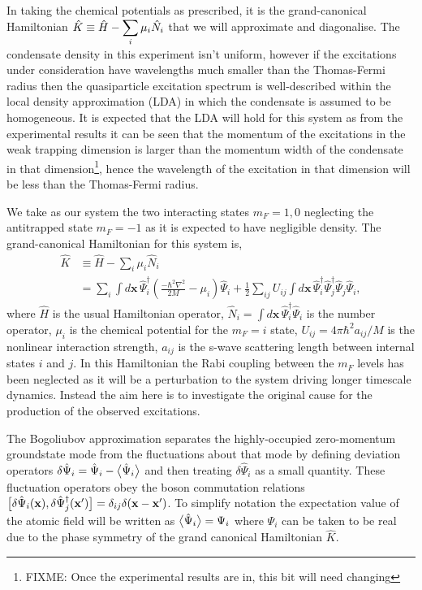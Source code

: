 In taking the chemical potentials as prescribed, it is the grand-canonical Hamiltonian $\displaystyle\protect{\hat{K} \equiv \hat{H} - \sum_i \mu_i \hat{N}_i}$ that we will approximate and diagonalise.  The condensate density in this experiment isn't uniform, however if the excitations under consideration have wavelengths much smaller than the Thomas-Fermi radius then the quasiparticle excitation spectrum is well-described within the local density approximation (LDA) \citep{Stamper-Kurn:1999,Zambelli:2000} in which the condensate is assumed to be homogeneous.  It is expected that the LDA will hold for this system as from the experimental results it can be seen that the momentum of the excitations in the weak trapping dimension is larger than the momentum width of the condensate in that dimension\footnote{FIXME: Once the experimental results are in, this bit will need changing}, hence the wavelength of the excitation in that dimension will be less than the Thomas-Fermi radius.


We take as our system the two interacting states $m_F=1, 0$ neglecting the antitrapped state $m_F=-1$ as it is expected to have negligible density. The grand-canonical Hamiltonian for this system is,
\begin{align}
    \hat{K} &\equiv \hat{H} - \sum_i \mu_i \hat{N}_i\\
            &= \sum_i \int d\mathbf{x}\, \hat{\Psi}_i^\dagger \left(\frac{-\hbar^2 \nabla^2}{2 M} - \mu_i\right)\hat{\Psi}_i + \frac{1}{2} \sum_{i j} U_{i j}\int d\mathbf{x}\, \hat{\Psi}_i^\dagger \hat{\Psi}_j^\dagger \hat{\Psi}_j \hat{\Psi}_i,
\end{align}
where $\hat{H}$ is the usual Hamiltonian operator, $\displaystyle\hat{N}_i= \int d\mathbf{x}\, \hat{\Psi}_i^\dagger \hat{\Psi}_i$ is the number operator, $\mu_i$ is the chemical potential for the $m_F=i$ state, $U_{ij} = 4\pi \hbar^2 a_{ij}/M$ is the nonlinear interaction strength, $a_{ij}$ is the s-wave scattering length between internal states $i$ and $j$. In this Hamiltonian the Rabi coupling between the $m_F$ levels has been neglected as it will be a perturbation to the system driving longer timescale dynamics. Instead the aim here is to investigate the original cause for the production of the observed excitations.

The Bogoliubov approximation separates the highly-occupied zero-momentum groundstate mode from the fluctuations about that mode by defining deviation operators $\delta\hat{\Psi}_i = \hat{\Psi}_i - \big<\hat{\Psi}_i\big>$ and then treating $\delta\hat{\Psi}_i$ as a small quantity. These fluctuation operators obey the boson commutation relations $\big[\delta\hat{\Psi}_i(\mathbf{x}), \delta \hat{\Psi}_j^\dagger(\mathbf{x}')\big] = \delta_{i j} \delta(\mathbf{x}-\mathbf{x}')$. To simplify notation the expectation value of the atomic field will be written as $\big<\hat{\Psi}_i\big> = \Psi_i$ where $\Psi_i$ can be taken to be real due to the phase symmetry of the grand canonical Hamiltonian $\hat{K}$.

